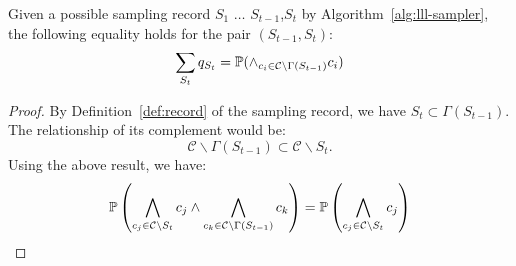\begin{lemma} \label{eq:pair-prob}
    Given a possible sampling record $S_1$ $\ldots$ $S_{t-1}$,$S_t$ by Algorithm~\ref{alg:lll-sampler}, the following equality holds for the pair $(S_{t-1},S_t)$:
    \begin{equation*}
        \sum_{S_t}q_{S_t}=\mathbb{P}(\wedge_{c_i \in \mathcal{C}\backslash \Gamma(S_{t-1})}c_i)
    \end{equation*}
    \begin{proof}
        By Definition~\ref{def:record} of the sampling record, we have $S_t \subset \Gamma(S_{t-1})$. The  relationship of its complement would be:
        \begin{equation*}
            \mathcal{C}\backslash\Gamma(S_{t-1})\subset \mathcal{C}\backslash S_t.
        \end{equation*}
        Using the above result, we have:
        \begin{equation}\label{eq:subset}
            \mathbb{P}\left(\bigwedge_{c_j \in \mathcal{C}\backslash S_t}c_j \wedge \bigwedge_{c_k \in \mathcal{C}\backslash \Gamma(S_{t-1})}c_k \right)=
            \mathbb{P}\left(\bigwedge_{c_j \in \mathcal{C}\backslash S_t}c_j \right)
        \end{equation}


\end{proof}
\end{lemma}

